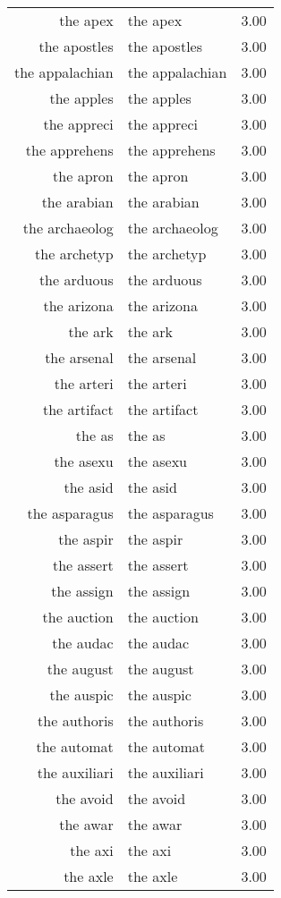 \begin{table}[ht]
\begin{tabular}{rlr}
  the apex & the apex & 3.00 \\ 
  the apostles & the apostles & 3.00 \\ 
  the appalachian & the appalachian & 3.00 \\ 
  the apples & the apples & 3.00 \\ 
  the appreci & the appreci & 3.00 \\ 
  the apprehens & the apprehens & 3.00 \\ 
  the apron & the apron & 3.00 \\ 
  the arabian & the arabian & 3.00 \\ 
  the archaeolog & the archaeolog & 3.00 \\ 
  the archetyp & the archetyp & 3.00 \\ 
  the arduous & the arduous & 3.00 \\ 
  the arizona & the arizona & 3.00 \\ 
  the ark & the ark & 3.00 \\ 
  the arsenal & the arsenal & 3.00 \\ 
  the arteri & the arteri & 3.00 \\ 
  the artifact & the artifact & 3.00 \\ 
  the as & the as & 3.00 \\ 
  the asexu & the asexu & 3.00 \\ 
  the asid & the asid & 3.00 \\ 
  the asparagus & the asparagus & 3.00 \\ 
  the aspir & the aspir & 3.00 \\ 
  the assert & the assert & 3.00 \\ 
  the assign & the assign & 3.00 \\ 
  the auction & the auction & 3.00 \\ 
  the audac & the audac & 3.00 \\ 
  the august & the august & 3.00 \\ 
  the auspic & the auspic & 3.00 \\ 
  the authoris & the authoris & 3.00 \\ 
  the automat & the automat & 3.00 \\ 
  the auxiliari & the auxiliari & 3.00 \\ 
  the avoid & the avoid & 3.00 \\ 
  the awar & the awar & 3.00 \\ 
  the axi & the axi & 3.00 \\ 
  the axle & the axle & 3.00 \\ 

\end{tabular}
\end{table}
